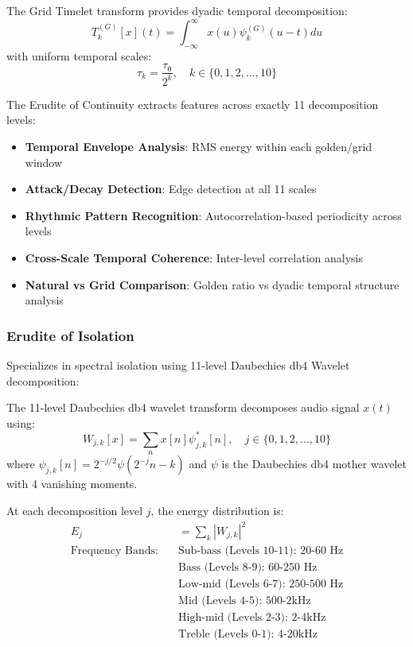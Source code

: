 \begin{definition}
The Grid Timelet transform provides dyadic temporal decomposition:
\begin{equation}
T^{(G)}_{k}[x](t) = \int_{-\infty}^{\infty} x(u) \psi^{(G)}_{k}(u-t) du
\end{equation}
with uniform temporal scales:
\begin{equation}
\tau_k = \frac{\tau_0}{2^k}, \quad k \in \{0,1,2,...,10\}
\end{equation}
\end{definition}

The Erudite of Continuity extracts features across exactly 11 decomposition levels:
\begin{itemize}
    \item \textbf{Temporal Envelope Analysis}: RMS energy within each golden/grid window
    \item \textbf{Attack/Decay Detection}: Edge detection at all 11 scales  
    \item \textbf{Rhythmic Pattern Recognition}: Autocorrelation-based periodicity across levels
    \item \textbf{Cross-Scale Temporal Coherence}: Inter-level correlation analysis
    \item \textbf{Natural vs Grid Comparison}: Golden ratio vs dyadic temporal structure analysis
\end{itemize}

\subsubsection{Erudite of Isolation}
Specializes in spectral isolation using 11-level Daubechies db4 Wavelet decomposition:

\begin{definition}
The 11-level Daubechies db4 wavelet transform decomposes audio signal $x(t)$ using:
\begin{equation}
W_{j,k}[x] = \sum_{n} x[n] \psi_{j,k}^*[n], \quad j \in \{0,1,2,...,10\}
\end{equation}
where $\psi_{j,k}[n] = 2^{-j/2} \psi(2^{-j}n - k)$ and $\psi$ is the Daubechies db4 mother wavelet with 4 vanishing moments.
\end{definition}

\begin{definition}
At each decomposition level $j$, the energy distribution is:
\begin{align}
E_j &= \sum_{k} |W_{j,k}|^2 \\
\text{Frequency Bands:} \quad &\text{Sub-bass (Levels 10-11): 20-60 Hz} \\
&\text{Bass (Levels 8-9): 60-250 Hz} \\
&\text{Low-mid (Levels 6-7): 250-500 Hz} \\
&\text{Mid (Levels 4-5): 500-2kHz} \\
&\text{High-mid (Levels 2-3): 2-4kHz} \\
&\text{Treble (Levels 0-1): 4-20kHz}
\end{align}
\end{definition}

